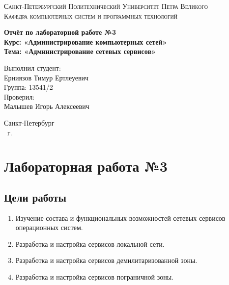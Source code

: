 \documentclass[14pt,a4paper,report]{report}
\begin{document}
\def\contentsname{Содержание}

\begin{titlepage}
	\begin{center}
		\textsc{Санкт-Петербургский Политехнический 
			Университет Петра Великого\\[5mm]
			Кафедра компьютерных систем и программных технологий}
		
		\vfill
		
		\textbf{Отчёт по лабораторной работе №3\\[3mm]
			Курс: «Администрирование компьютерных сетей»\\[3mm]
			Тема: «Администрирование сетевых сервисов»\\[35mm]
			}
	\end{center}
	
	\hfill
	\begin{minipage}{.5\textwidth}
		Выполнил студент:\\[2mm] 
		Ерниязов Тимур Ертлеуевич\\
		Группа: 13541/2\\[5mm]
		
		Проверил:\\[2mm] 
		Малышев Игорь Алексеевич
	\end{minipage}
	\vfill
	\begin{center}
		Санкт-Петербург\\ \the\year\ г.
	\end{center}
\end{titlepage}

\tableofcontents
\clearpage

\chapter{Лабораторная работа №3}
\section{Цели работы}
\begin{enumerate}
\item Изучение состава и функциональных возможностей сетевых сервисов операционных систем.
\item Разработка и настройка сервисов локальной сети.
\item Разработка и настройка сервисов демилитаризованной зоны.
\item Разработка и настройка сервисов пограничной зоны.
\end{enumerate}
\end{document}

